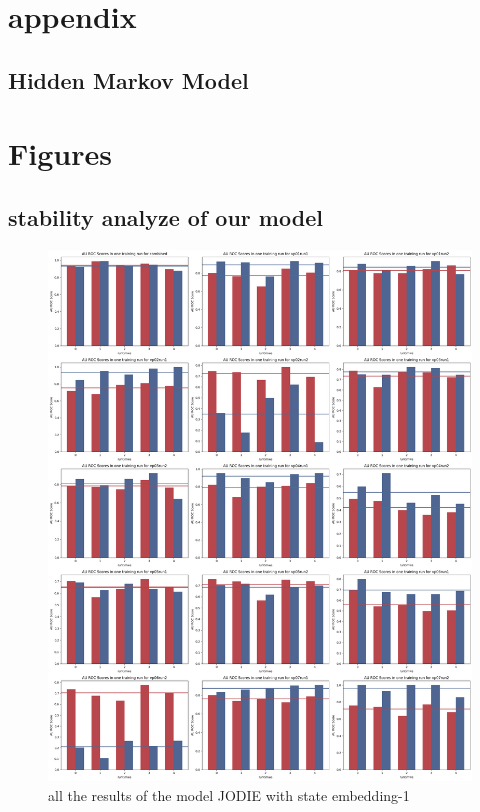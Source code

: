 \chapter{appendix}\label{chapter:appendix}


\section{Hidden Markov Model}


\chapter{Figures}

\section{stability analyze of our model}

\begin{figure}
    \centering
    \includegraphics[width=\textwidth]{figures/05_all_results1.png}
    \caption{all the results of the model JODIE with state embedding-1} 
    \label{fig:all_results1}
\end{figure}

